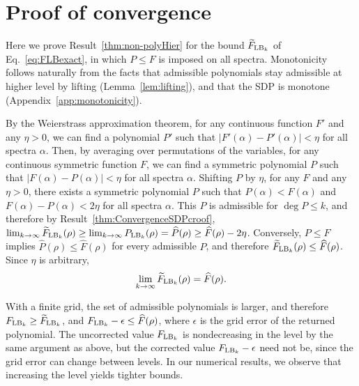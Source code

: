 \documentclass[11pt,a4paper]{report}
\renewcommand{\a}{\alpha}
\newcounter{reptag}
\newif\iftags \tagsfalse   %
\newcommand{\reptagbox}[3]{\iftags\par\smallskip\noindent\refstepcounter{reptag}%
  \fcolorbox{#1}{#1!7}{\parbox{\dimexpr\linewidth-2\fboxsep-2\fboxrule\relax}{\small
  \textcolor{#1}{\textbf{[\thereptag]\ #2.}}\ #3}}\par\smallskip\fi}
\newcommand{\deeper}[1]{\reptagbox{tagP}{Deeper proof}{#1}}
\begin{document}
\section{Proof of convergence}\label{app:LPconvergence}
Here we prove Result~\ref{thm:non-polyHier} for the bound $\widetilde F_{{\rm LB}_k}$ of Eq.~\eqref{eq:FLBexact}, in which $P\leq F$ is imposed on all spectra. Monotonicity follows naturally from the facts that admissible polynomials stay admissible at higher level by lifting (Lemma~\ref{lem:lifting}), and that the SDP is monotone (Appendix~\ref{app:monotonicity}).

By the Weierstrass approximation theorem, for any continuous function $F'$ and any $\eta>0$, we can find a polynomial $P'$ such that $|F'(\a)-P'(\a)| < \eta$ for all spectra $\a$. Then, by averaging over permutations of the variables, for any continuous symmetric function $F$, we can find a symmetric polynomial $P$ such that $|F(\a)-P(\a)| < \eta$ for all spectra $\a$.
Shifting $P$ by $\eta$, for any $F$ and any $\eta>0$, there exists a symmetric polynomial $P$ such that $P(\a) < F(\a)$ and $F(\a)-P(\a) < 2\eta$ for all spectra $\a$. This $P$ is admissible for $\deg P \leq k$, and therefore by Result~\ref{thm:ConvergenceSDPcroof}, $\lim_{k\to\infty}\widetilde F_{{\rm LB}_k}(\rho)\geq\lim_{k\to\infty}P_{{\rm LB}_k}(\rho)=\widehat P(\rho)\geq\widehat F(\rho)-2\eta$. Conversely, $P\leq F$ implies $\widehat P(\rho)\leq\widehat F(\rho)$ for every admissible $P$, and therefore $\widetilde F_{{\rm LB}_k}(\rho)\leq\widehat F(\rho)$. Since $\eta$ is arbitrary,
\begin{equation}
    \lim_{k\to\infty}\widetilde F_{{\rm LB}_k}(\rho)=\widehat F(\rho).
\end{equation}

With a finite grid, the set of admissible polynomials is larger, and therefore $F_{{\rm LB}_k}\geq\widetilde F_{{\rm LB}_k}$, and $F_{{\rm LB}_k}-\epsilon\leq\widehat F(\rho)$, where $\epsilon$ is the grid error of the returned polynomial. The uncorrected value $F_{{\rm LB}_k}$ is nondecreasing in the level by the same argument as above, but the corrected value $F_{{\rm LB}_k}-\epsilon$ need not be, since the grid error can change between levels. In our numerical results, we observe that increasing the level yields tighter bounds.
\deeper{Two statements of the main text are used without proof. (i) $|F_{{\rm LB}_k}-\widetilde F_{{\rm LB}_k}|\le\epsilon_k$: one direction is $F_{{\rm LB}_k}\ge\widetilde F_{{\rm LB}_k}$ (more admissible polynomials), the other is that $P^*-\epsilon$ is admissible for $\widetilde F_{{\rm LB}_k}$. (ii) The grid error $\epsilon=\max_\a(P^*-F)$ is itself a non-convex maximisation. Say how you compute it. For the LOCC runs it was checked on a $1/600$ lattice, which is an estimate rather than a certificate; a rigorous version needs e.g.\ a Lipschitz bound on $P^*-F$ times the lattice spacing (careful: $F$ is not Lipschitz at the boundary for the entropy).}
\deeper{Sion's theorem needs one of the two sets to be compact; the set of feasible $\Omega_k$ is, but say so at each use. State the Weierstrass approximation on the simplex together with the symmetrisation step as a lemma, since both the non-polynomial result and the LOCC proof rely on it.}
\end{document}
